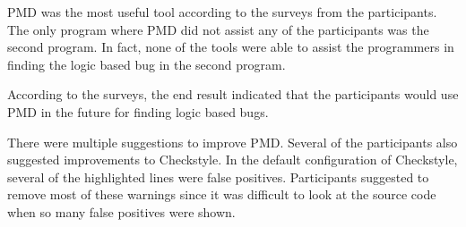PMD was the most useful tool according to the surveys from the participants. The only program where PMD did not assist any of the participants was the second program. In fact, none of the tools were able to assist the programmers in finding the logic based bug in the second program. 

According to the surveys, the end result indicated that the participants would use PMD in the future for finding logic based bugs.

There were multiple suggestions to improve PMD. Several of the participants also suggested improvements to Checkstyle. In the default configuration of Checkstyle, several of the highlighted lines were false positives. Participants suggested to remove most of these warnings since it was difficult to look at the source code when so many false positives were shown. 

